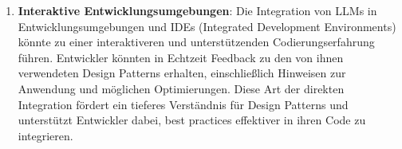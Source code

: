 \begin{enumerate}
    \item \textbf{Interaktive Entwicklungsumgebungen}: Die Integration von LLMs in Entwicklungsumgebungen und IDEs (Integrated Development Environments) könnte zu einer interaktiveren und unterstützenden Codierungserfahrung führen. Entwickler könnten in Echtzeit Feedback zu den von ihnen verwendeten Design Patterns erhalten, einschließlich Hinweisen zur Anwendung und möglichen Optimierungen. Diese Art der direkten Integration fördert ein tieferes Verständnis für Design Patterns und unterstützt Entwickler dabei, best practices effektiver in ihren Code zu integrieren.
\end{enumerate}